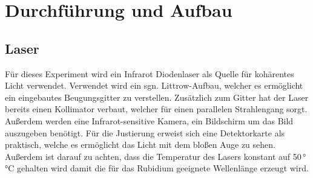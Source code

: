 \section{Durchführung und Aufbau}
\label{sec:Durchführung}

\subsection{Laser}
\label{sec:AufbLaser}
Für dieses Experiment wird ein Infrarot Diodenlaser als Quelle für kohärentes Licht verwendet. Verwendet wird ein sgn. Littrow-Aufbau, welcher es ermöglicht ein eingebautes Beugungsgitter
zu verstellen. Zusätzlich zum Gitter hat der Laser bereits einen Kollimator verbaut, welcher für einen parallelen Strahlengang sorgt.
Außerdem werden eine Infrarot-sensitive Kamera, ein Bildschirm um das Bild auszugeben benötigt. Für die Justierung erweist sich eine Detektorkarte als praktisch, welche es 
ermöglicht das Licht mit dem bloßen Auge zu sehen. Außerdem ist darauf zu achten, dass die Temperatur des Lasers konstant auf 50\,°\unit{\celsius} gehalten wird damit die für das Rubidium geeignete Wellenlänge erzeugt wird.


